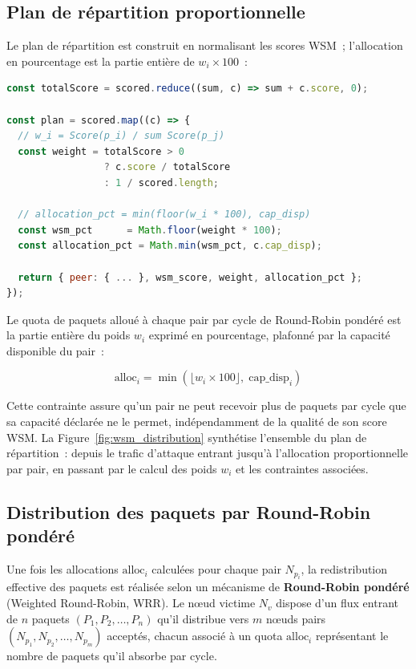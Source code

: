 \subsection{Plan de répartition proportionnelle}

Le plan de répartition est construit en normalisant les scores WSM~; l'allocation en pourcentage est la partie entière de $w_i \times 100$~:

\begin{lstlisting}[language=JavaScript, caption={Construction du plan de répartition proportionnelle.}, label=lst:alloc]
const totalScore = scored.reduce((sum, c) => sum + c.score, 0);

const plan = scored.map((c) => {
  // w_i = Score(p_i) / sum Score(p_j)
  const weight = totalScore > 0
                 ? c.score / totalScore
                 : 1 / scored.length;

  // allocation_pct = min(floor(w_i * 100), cap_disp)
  const wsm_pct      = Math.floor(weight * 100);
  const allocation_pct = Math.min(wsm_pct, c.cap_disp);

  return { peer: { ... }, wsm_score, weight, allocation_pct };
});
\end{lstlisting}

Le quota de paquets alloué à chaque pair par cycle de Round-Robin pondéré est la partie entière du poids $w_i$ exprimé en pourcentage, plafonné par la capacité disponible du pair~:

\begin{equation}
\label{eq:alloc_cap}
\mathrm{alloc}_i = \min\!\left(\lfloor w_i \times 100 \rfloor,\; \mathrm{cap\_disp}_i\right)
\end{equation}

\noindent Cette contrainte assure qu'un pair ne peut recevoir plus de paquets par cycle que sa capacité déclarée ne le permet, indépendamment de la qualité de son score WSM. La Figure~\ref{fig:wsm_distribution} synthétise l'ensemble du plan de répartition~: depuis le trafic d'attaque entrant jusqu'à l'allocation proportionnelle par pair, en passant par le calcul des poids $w_i$ et les contraintes associées.

\subsection{Distribution des paquets par Round-Robin pondéré}
\label{subsec:wrr}

Une fois les allocations $\mathrm{alloc}_i$ calculées pour chaque pair $N_{p_i}$, la redistribution effective des paquets est réalisée selon un mécanisme de \textbf{Round-Robin pondéré} (Weighted Round-Robin, WRR). Le nœud victime $N_v$ dispose d'un flux entrant de $n$ paquets $(P_1, P_2, \ldots, P_n)$ qu'il distribue vers $m$ nœuds pairs $(N_{p_1}, N_{p_2}, \ldots, N_{p_m})$ acceptés, chacun associé à un quota $\mathrm{alloc}_i$ représentant le nombre de paquets qu'il absorbe par cycle.

